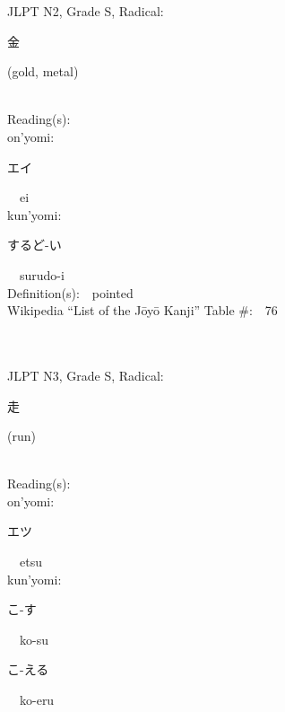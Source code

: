 \begin{multicols}{2}
{JLPT N2, Grade S, Radical:\ \ {\begin{CJK}{UTF8}{min} 金 \end{CJK}} (gold, metal) } \\
Reading(s):\ \ \\
{\hspace*{1em}}on'yomi:\ \ \\
{\hspace*{2em}}{\begin{CJK}{UTF8}{min} エイ \end{CJK}}\ \ ei\ \ \\
{\hspace*{1em}}kun'yomi:\ \ \\
{\hspace*{2em}}{\begin{CJK}{UTF8}{min} するど-い \end{CJK}}\ \ surudo-i\ \ \\
Definition(s):\ \ pointed \\
Wikipedia ``List of the J\=oy\=o Kanji'' Table \#:\ \ 76 \\
\ \ \\
{\fontsize{34pt}{40pt}  }\ \ \\  %
{JLPT N3, Grade S, Radical:\ \ {\begin{CJK}{UTF8}{min} 走 \end{CJK}} (run) } \\
Reading(s):\ \ \\
{\hspace*{1em}}on'yomi:\ \ \\
{\hspace*{2em}}{\begin{CJK}{UTF8}{min} エツ \end{CJK}}\ \ etsu\ \ \\
{\hspace*{1em}}kun'yomi:\ \ \\
{\hspace*{2em}}{\begin{CJK}{UTF8}{min} こ-す \end{CJK}}\ \ ko-su\ \ \\
{\hspace*{2em}}{\begin{CJK}{UTF8}{min} こ-える \end{CJK}}\ \ ko-eru\ \ \\

\end{multicols}
